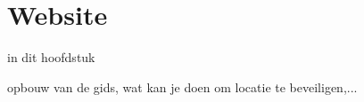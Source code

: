 \chapter{Website}
\label{ch:website}
in dit hoofdstuk

opbouw van de gids, wat kan je doen om locatie te beveiligen,...
